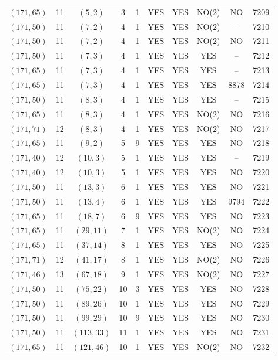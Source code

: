 \begin{longtable}{|c|c|c|c|c|c|c|c|c|c|}
$(171, 65)$ & 11 & $(5, 2)$ & 3 & 1 & YES & YES & NO(2) & NO & 7209\\
$(171, 50)$ & 11 & $(7, 2)$ & 4 & 1 & YES & YES & NO(2) & -- & 7210\\
$(171, 50)$ & 11 & $(7, 2)$ & 4 & 1 & YES & YES & NO(2) & NO & 7211\\
$(171, 50)$ & 11 & $(7, 3)$ & 4 & 1 & YES & YES & YES & -- & 7212\\
$(171, 65)$ & 11 & $(7, 3)$ & 4 & 1 & YES & YES & YES & -- & 7213\\
$(171, 65)$ & 11 & $(7, 3)$ & 4 & 1 & YES & YES & YES & 8878 & 7214\\
$(171, 50)$ & 11 & $(8, 3)$ & 4 & 1 & YES & YES & YES & -- & 7215\\
$(171, 65)$ & 11 & $(8, 3)$ & 4 & 1 & YES & YES & NO(2) & NO & 7216\\
$(171, 71)$ & 12 & $(8, 3)$ & 4 & 1 & YES & YES & NO(2) & NO & 7217\\
$(171, 65)$ & 11 & $(9, 2)$ & 5 & 9 & YES & YES & YES & NO & 7218\\
$(171, 40)$ & 12 & $(10, 3)$ & 5 & 1 & YES & YES & YES & -- & 7219\\
$(171, 40)$ & 12 & $(10, 3)$ & 5 & 1 & YES & YES & YES & NO & 7220\\
$(171, 50)$ & 11 & $(13, 3)$ & 6 & 1 & YES & YES & YES & NO & 7221\\
$(171, 50)$ & 11 & $(13, 4)$ & 6 & 1 & YES & YES & YES & 9794 & 7222\\
$(171, 65)$ & 11 & $(18, 7)$ & 6 & 9 & YES & YES & YES & NO & 7223\\
$(171, 65)$ & 11 & $(29, 11)$ & 7 & 1 & YES & YES & NO(2) & NO & 7224\\
$(171, 65)$ & 11 & $(37, 14)$ & 8 & 1 & YES & YES & YES & NO & 7225\\
$(171, 71)$ & 12 & $(41, 17)$ & 8 & 1 & YES & YES & NO(2) & NO & 7226\\
$(171, 46)$ & 13 & $(67, 18)$ & 9 & 1 & YES & YES & NO(2) & NO & 7227\\
$(171, 50)$ & 11 & $(75, 22)$ & 10 & 3 & YES & YES & YES & NO & 7228\\
$(171, 50)$ & 11 & $(89, 26)$ & 10 & 1 & YES & YES & YES & NO & 7229\\
$(171, 50)$ & 11 & $(99, 29)$ & 10 & 9 & YES & YES & YES & NO & 7230\\
$(171, 50)$ & 11 & $(113, 33)$ & 11 & 1 & YES & YES & YES & NO & 7231\\
$(171, 65)$ & 11 & $(121, 46)$ & 10 & 1 & YES & YES & NO(2) & NO & 7232\\

\end{longtable}
